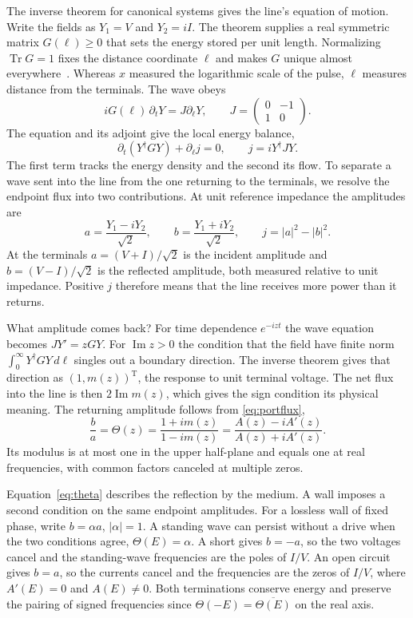 \documentclass[11pt,letterpaper]{article}
\newcommand{\Tr}{\operatorname{Tr}}
\numberwithin{equation}{section}
\begin{document}
The inverse theorem for canonical systems gives the line's equation of motion. Write the fields as $Y_1=V$ and $Y_2=iI$. The theorem supplies a real symmetric matrix $G(\ell)\ge0$ that sets the energy stored per unit length. Normalizing $\Tr G=1$ fixes the distance coordinate $\ell$ and makes $G$ unique almost everywhere~\cite{canonicalphysics}. Whereas $x$ measured the logarithmic scale of the pulse, $\ell$ measures distance from the terminals. The wave obeys
\begin{equation}
 iG(\ell)\,\partial_tY=J\partial_\ell Y,\qquad
 J=\begin{pmatrix}0&-1\\1&0\end{pmatrix}.
 \label{eq:localwave}
\end{equation}
The equation and its adjoint give the local energy balance,
\[
 \partial_t(Y^\dagger GY)+\partial_\ell j=0,\qquad j=iY^\dagger JY.
\]
The first term tracks the energy density and the second its flow. To separate a wave sent into the line from the one returning to the terminals, we resolve the endpoint flux into two contributions. At unit reference impedance the amplitudes are
\begin{equation}
 a=\frac{Y_1-iY_2}{\sqrt2},\qquad b=\frac{Y_1+iY_2}{\sqrt2},
 \qquad j=|a|^2-|b|^2 .
 \label{eq:portflux}
\end{equation}
At the terminals $a=(V+I)/\sqrt2$ is the incident amplitude and $b=(V-I)/\sqrt2$ is the reflected amplitude, both measured relative to unit impedance. Positive $j$ therefore means that the line receives more power than it returns.

What amplitude comes back? For time dependence $e^{-izt}$ the wave equation becomes $JY'=zGY$. For $\operatorname{Im}z>0$ the condition that the field have finite norm $\int_0^\infty Y^\dagger GY\,d\ell$ singles out a boundary direction. The inverse theorem gives that direction as $(1,m(z))^{\mathrm T}$, the response to unit terminal voltage. The net flux into the line is then $2\operatorname{Im}m(z)$, which gives the sign condition its physical meaning. The returning amplitude follows from \eqref{eq:portflux},
\begin{equation}
 \frac{b}{a}=\Theta(z)=\frac{1+i m(z)}{1-i m(z)}
             =\frac{A(z)-iA'(z)}{A(z)+iA'(z)} .
 \label{eq:theta}
\end{equation}
Its modulus is at most one in the upper half-plane and equals one at real frequencies, with common factors canceled at multiple zeros.

Equation~\eqref{eq:theta} describes the reflection by the medium. A wall imposes a second condition on the same endpoint amplitudes. For a lossless wall of fixed phase, write $b=\alpha a$, $|\alpha|=1$. A standing wave can persist without a drive when the two conditions agree, $\Theta(E)=\alpha$. A short gives $b=-a$, so the two voltages cancel and the standing-wave frequencies are the poles of $I/V$. An open circuit gives $b=a$, so the currents cancel and the frequencies are the zeros of $I/V$, where $A'(E)=0$ and $A(E)\ne0$. Both terminations conserve energy and preserve the pairing of signed frequencies since $\Theta(-E)=\overline{\Theta(E)}$ on the real axis.
\end{document}
